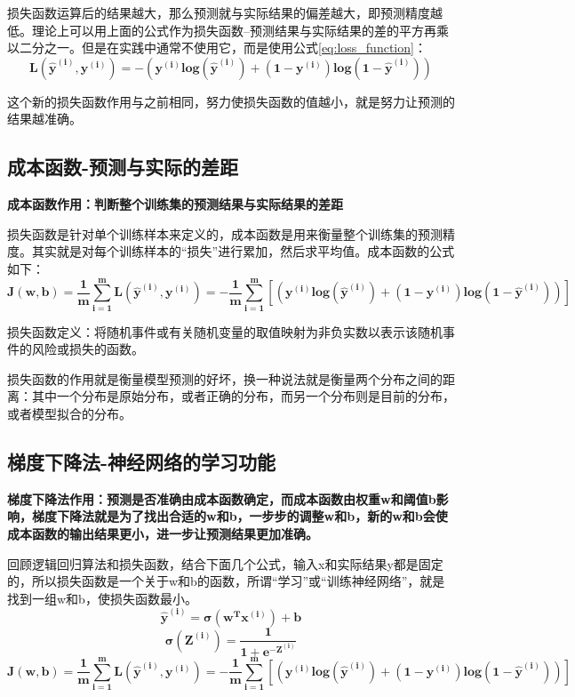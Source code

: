 \documentclass[UTF-8]{article} %
\begin{document}
	损失函数运算后的结果越大，那么预测就与实际结果的偏差越大，即预测精度越低。理论上可以用上面的公式作为损失函数--预测结果与实际结果的差的平方再乘以二分之一。但是在实践中通常不使用它，而是使用公式\ref{eq:loss_function}：
	\begin{equation}
		\bm{L(\hat{y}^{(i)}, y^{(i)}) = -(y^{(i)}log(\hat{y}^{(i)}) + (1 - y^{(i)})log(1 - \hat{y}^{(i)}))} \label{eq:loss_function}
	\end{equation}
	
	这个新的损失函数作用与之前相同，努力使损失函数的值越小，就是努力让预测的结果越准确。
	
	\subsection{成本函数-预测与实际的差距}
	\textbf{成本函数作用：判断整个训练集的预测结果与实际结果的差距}
	
	损失函数是针对单个训练样本来定义的，成本函数是用来衡量整个训练集的预测精度。其实就是对每个训练样本的“损失”进行累加，然后求平均值。成本函数的公式如下：
	\begin{equation}
		\bm{J(w,b) = \frac{1}{m}\sum_{i=1}^{m}L(\hat{y}^{(i)}, y^{(i)}) = - \frac{1}{m}\sum_{i=1}^{m}[(y^{(i)}log(\hat{y}^{(i)}) + (1 - y^{(i)})log(1 - \hat{y}^{(i)}))]} \label{eq:cost}
	\end{equation}

	损失函数定义：将随机事件或有关随机变量的取值映射为非负实数以表示该随机事件的风险或损失的函数。
	
	损失函数的作用就是衡量模型预测的好坏，换一种说法就是衡量两个分布之间的距离：其中一个分布是原始分布，或者正确的分布，而另一个分布则是目前的分布，或者模型拟合的分布。
	
	\subsection{梯度下降法-神经网络的学习功能}
	\textbf{梯度下降法作用：预测是否准确由成本函数确定，而成本函数由权重w和阈值b影响，梯度下降法就是为了找出合适的w和b，一步步的调整w和b，新的w和b会使成本函数的输出结果更小，进一步让预测结果更加准确。}

	回顾逻辑回归算法和损失函数，结合下面几个公式，输入x和实际结果y都是固定的，所以损失函数是一个关于w和b的函数，所谓“学习”或“训练神经网络”，就是找到一组w和b，使损失函数最小。
	$$\bm{\hat{y}^{(i)} = \sigma (w^Tx^{(i)}) + b}$$
	$$\bm{\sigma (Z^{(i)}) = \frac{1}{1 + e^{-Z^{(i)}}}}$$
	$$
		\bm{J(w,b) = \frac{1}{m}\sum_{i=1}^{m}L(\hat{y}^{(i)}, y^{(i)}) = - \frac{1}{m}\sum_{i=1}^{m}[(y^{(i)}log(\hat{y}^{(i)}) + (1 - y^{(i)})log(1 - \hat{y}^{(i)}))]}
	$$
	
\end{document}
